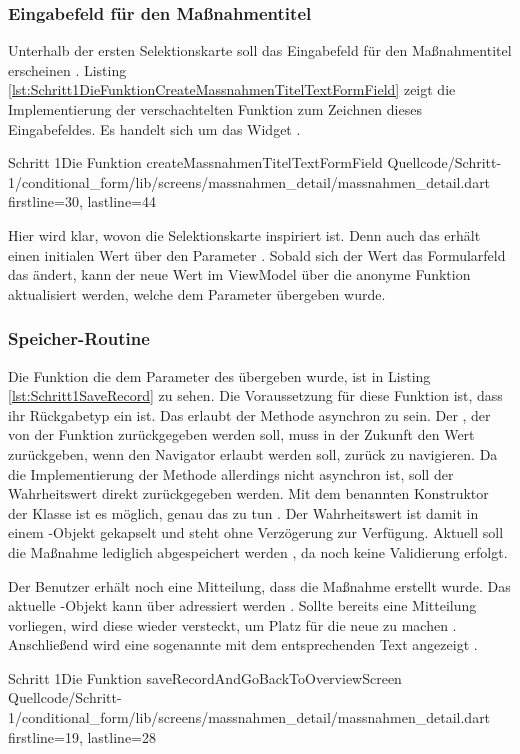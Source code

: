 \subsubsection{Eingabefeld für den Maßnahmentitel}


Unterhalb der ersten Selektionskarte soll das Eingabefeld für den Maßnahmentitel erscheinen .
Listing \ref{lst:Schritt1DieFunktionCreateMassnahmenTitelTextFormField} zeigt die Implementierung der verschachtelten Funktion zum Zeichnen dieses Eingabefeldes.
 Es handelt sich um das Widget  .


\begin{alexlisting}{Schritt 1}{Die Funktion createMassnahmenTitelTextFormField}
  {Quellcode/Schritt-1/conditional_form/lib/screens/massnahmen_detail/massnahmen_detail.dart}
  {firstline=30, lastline=44}
  \label{lst:Schritt1DieFunktionCreateMassnahmenTitelTextFormField}
\end{alexlisting}

Hier wird klar, wovon die Selektionskarte inspiriert ist.
Denn auch das  erhält einen initialen Wert über den Parameter .
Sobald sich der Wert das Formularfeld das ändert, kann der neue Wert im ViewModel über die anonyme Funktion aktualisiert werden, welche dem Parameter  übergeben wurde.


\subsubsection{Speicher-Routine}


Die Funktion die dem Parameter  des  übergeben wurde, ist in Listing \ref{lst:Schritt1SaveRecord} zu sehen.
Die Voraussetzung für diese Funktion ist, dass ihr Rückgabetyp ein  ist.
Das erlaubt der Methode asynchron zu sein.
Der , der von der Funktion zurückgegeben werden soll, muss in der Zukunft den Wert  zurückgeben, wenn den Navigator erlaubt  werden soll, zurück zu navigieren.
Da die Implementierung der Methode allerdings nicht asynchron ist, soll der Wahrheitswert direkt zurückgegeben werden.
Mit dem benannten Konstruktor  der Klasse  ist es möglich, genau das zu tun .
 Der Wahrheitswert ist damit in einem -Objekt gekapselt und steht ohne Verzögerung zur Verfügung.
Aktuell soll die Maßnahme lediglich abgespeichert werden , da noch keine Validierung erfolgt.

Der Benutzer erhält noch eine Mitteilung, dass die Maßnahme erstellt wurde.
Das aktuelle -Objekt kann über  adressiert werden . Sollte bereits eine Mitteilung vorliegen, wird diese wieder versteckt, um Platz für die neue zu machen . Anschließend wird eine sogenannte  mit dem entsprechenden Text angezeigt .

\begin{alexlisting}{Schritt 1}{Die Funktion saveRecordAndGoBackToOverviewScreen}
  {Quellcode/Schritt-1/conditional_form/lib/screens/massnahmen_detail/massnahmen_detail.dart}
  {firstline=19, lastline=28}
  \label{lst:Schritt1SaveRecord}
\end{alexlisting}

\ifincludeall \clearpage \fi
